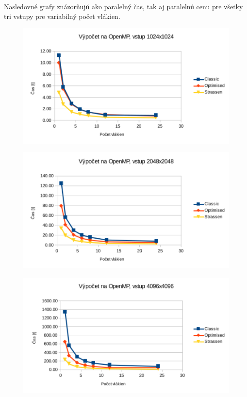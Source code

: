 \documentclass[slovak]{article}
\begin{document}
Nasledovné grafy znázorňujú ako paralelný čas, tak aj paralelnú cenu pre všetky tri vstupy pre variabilný počet vlákien.

\begin{figure}\centering
	\includegraphics[scale=1]{./images/1024_rychlost.pdf}
	\label{gr:graf1}
\end{figure}

\begin{figure}\centering
	\includegraphics[scale=1]{./images/2048_rychlost.pdf}
	\label{gr:graf2}
\end{figure}  

\begin{figure}\centering
	\includegraphics[scale=1]{./images/4096_rychlost.pdf}
	\label{gr:graf3}
\end{figure}  
\end{document}
